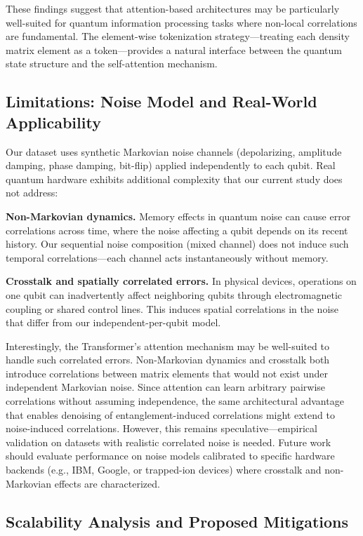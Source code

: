 \documentclass[11pt]{article}
\begin{document}
These findings suggest that attention-based architectures may be particularly well-suited for quantum information processing tasks where non-local correlations are fundamental. The element-wise tokenization strategy—treating each density matrix element as a token—provides a natural interface between the quantum state structure and the self-attention mechanism.
\subsection{Limitations: Noise Model and Real-World Applicability}
\label{sec:org7d59338}

Our dataset uses synthetic Markovian noise channels (depolarizing, amplitude damping, phase damping, bit-flip) applied independently to each qubit. Real quantum hardware exhibits additional complexity that our current study does not address:

\textbf{Non-Markovian dynamics.} Memory effects in quantum noise can cause error correlations across time, where the noise affecting a qubit depends on its recent history. Our sequential noise composition (mixed channel) does not induce such temporal correlations—each channel acts instantaneously without memory.

\textbf{Crosstalk and spatially correlated errors.} In physical devices, operations on one qubit can inadvertently affect neighboring qubits through electromagnetic coupling or shared control lines. This induces spatial correlations in the noise that differ from our independent-per-qubit model.

Interestingly, the Transformer's attention mechanism may be well-suited to handle such correlated errors. Non-Markovian dynamics and crosstalk both introduce correlations between matrix elements that would not exist under independent Markovian noise. Since attention can learn arbitrary pairwise correlations without assuming independence, the same architectural advantage that enables denoising of entanglement-induced correlations might extend to noise-induced correlations. However, this remains speculative—empirical validation on datasets with realistic correlated noise is needed. Future work should evaluate performance on noise models calibrated to specific hardware backends (e.g., IBM, Google, or trapped-ion devices) where crosstalk and non-Markovian effects are characterized.
\subsection{Scalability Analysis and Proposed Mitigations}
\label{sec:orgdc1e771}
\end{document}
